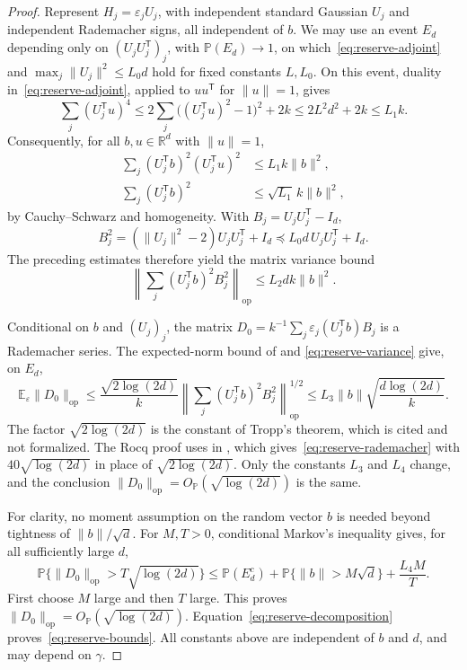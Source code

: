 \documentclass[11pt]{article}
\newcommand{\R}{\mathbb R}
\newcommand{\Pbb}{\mathbb P}
\newcommand{\E}{\mathbb E}
\newcommand{\opnorm}[1]{\lVert#1\rVert_{\mathrm{op}}}
\newcommand{\norm}[1]{\lVert#1\rVert}
\newcommand{\OP}{O_{\Pbb}}
\theoremstyle{remark}
\begin{document}
\begin{proof}
Represent $H_j=\varepsilon_jU_j$, with independent standard Gaussian
$U_j$ and independent Rademacher signs, all independent of $b$. We may
use an event $E_d$ depending only on $(U_jU_j^{\mathsf T})_j$, with
$\Pbb(E_d)\to1$, on which~\eqref{eq:reserve-adjoint} and
$\max_j\norm{U_j}^2\le L_0d$ hold for fixed constants $L,L_0$.
On this event, duality in~\eqref{eq:reserve-adjoint}, applied to
$uu^{\mathsf T}$ for $\norm u=1$, gives
\begin{equation}\label{eq:reserve-fourth}
 \sum_j(U_j^{\mathsf T}u)^4
 \le2\sum_j\big((U_j^{\mathsf T}u)^2-1\big)^2+2k
 \le2L^2d^2+2k\le L_1k.
\end{equation}
Consequently, for all $b,u\in\R^d$ with $\norm u=1$,
\begin{align*}
 \sum_j(U_j^{\mathsf T}b)^2(U_j^{\mathsf T}u)^2
     &\le L_1k\norm b^2,\\
 \sum_j(U_j^{\mathsf T}b)^2&\le\sqrt{L_1}\,k\norm b^2,
\end{align*}
by Cauchy--Schwarz and homogeneity. With $B_j=U_jU_j^{\mathsf T}-I_d$,
\[
 B_j^2=(\norm{U_j}^2-2)U_jU_j^{\mathsf T}+I_d
       \preceq L_0d\,U_jU_j^{\mathsf T}+I_d.
\]
The preceding estimates therefore yield the matrix variance bound
\begin{equation}\label{eq:reserve-variance}
 \left\|\sum_j(U_j^{\mathsf T}b)^2B_j^2\right\|_{\mathrm{op}}
       \le L_2dk\norm b^2.
\end{equation}

Conditional on $b$ and $(U_j)_j$, the matrix
$D_0=k^{-1}\sum_j\varepsilon_j(U_j^{\mathsf T}b)B_j$ is a Rademacher
series. The expected-norm bound of
\citet[Theorem 4.1.1]{TroppMatrixConcentration2015} and
\eqref{eq:reserve-variance} give, on $E_d$,
\begin{equation}\label{eq:reserve-rademacher}
 \E_\varepsilon\opnorm{D_0}
 \le\frac{\sqrt{2\log(2d)}}{k}
     \left\|\sum_j(U_j^{\mathsf T}b)^2B_j^2\right\|_{\mathrm{op}}^{1/2}
 \le L_3\norm b\sqrt{\frac{d\log(2d)}{k}}.
\end{equation}
The factor $\sqrt{2\log(2d)}$ is the constant of Tropp's theorem, which
is cited and not formalized. The Rocq proof uses
 in
, which
gives~\eqref{eq:reserve-rademacher} with $40\sqrt{\log(2d)}$ in place of
$\sqrt{2\log(2d)}$. Only the constants $L_3$ and $L_4$ change, and the
conclusion $\opnorm{D_0}=\OP(\sqrt{\log(2d)})$ is the same.

For clarity, no moment assumption on the random vector $b$ is needed
beyond tightness of $\norm b/\sqrt d$. For $M,T>0$, conditional Markov's
inequality gives, for all sufficiently large $d$,
\[
 \Pbb\{\opnorm{D_0}>T\sqrt{\log(2d)}\}
 \le\Pbb(E_d^c)+\Pbb\{\norm b>M\sqrt d\}+\frac{L_4M}{T}.
\]
First choose $M$ large and then $T$ large. This proves
$\opnorm{D_0}=\OP(\sqrt{\log(2d)})$. Equation~\eqref{eq:reserve-decomposition}
proves~\eqref{eq:reserve-bounds}. All constants above are independent of
$b$ and $d$, and may depend on $\gamma$.
\end{proof}
\end{document}
